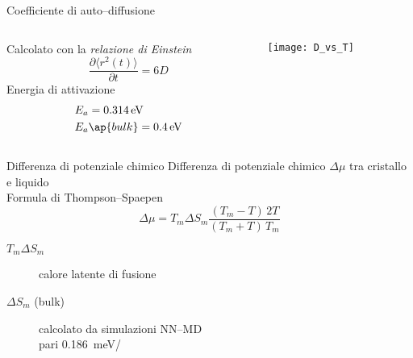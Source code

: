 \documentclass{beamer}
\begin{document}
\begin{frame}{Coefficiente di auto--diffusione}
 \begin{columns}
  \begin{column}{0.5\textwidth}
   Calcolato con la \emph{relazione di Einstein}
   \begin{equation*}
    \frac{\partial\langle r^2(t)\rangle}{\partial t}=6D
   \end{equation*}
   Energia di attivazione
   \begin{equation*}
    \begin{split}
        &E_a = \SI{0.314}{eV}\\
	&E_a\ap{bulk} = \SI{0.4}{eV}
    \end{split}
   \end{equation*}
  \end{column}
  \begin{column}{0.5\textwidth}
  \centering
   \texttt{[image: D\_vs\_T]}
   \begin{table}[h]
   \begin{center}
    \end{center}
  \end{table}
  \end{column}


 \end{columns}

\end{frame}


\begin{frame}{Differenza di potenziale chimico}
 Differenza di potenziale chimico $\Delta\mu$ tra cristallo e liquido\\[3pt]
 Formula di {\ev Thompson--Spaepen}
 \[ \Delta\mu = T_m\Delta S_m \frac{(T_m-T)\,2T}{(T_m+T)\,T_m} \]
 \begin{description}
 	\item [$T_m\Delta S_m$] calore latente di fusione
 	\item [$\Delta S_m$ (bulk)] calcolato da simulazioni NN--MD\\ pari \textcolor{themecolor}{\SI{0.186}{meV/}}
 \end{description}
 
\end{frame}
\end{document}
